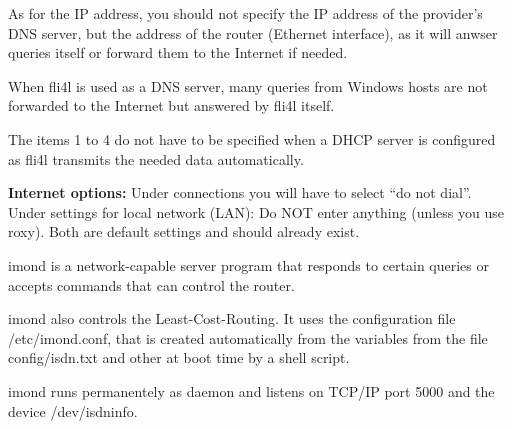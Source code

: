   As for the IP address, you should not specify the IP address of the provider's
  DNS server, but the address of the router (Ethernet interface), as it
  will anwser queries itself or forward them to the Internet if needed.

  When fli4l is used as a DNS server, many queries from Windows hosts are not
  forwarded to the Internet but answered by fli4l itself.


  The items 1 to 4 do not have to be specified when a DHCP server is
  configured as fli4l transmits the needed data automatically.

  \textbf{Internet options:} Under connections you will have to select ``do not dial''.
  Under settings for local network (LAN): Do NOT enter anything (unless you use
  roxy). Both are default settings and should already exist.



  imond is a network-capable server program that responds to certain queries
  or accepts commands that can control the router.

  imond also controls the Least-Cost-Routing. It uses the configuration
  file /etc/imond.conf, that is created automatically from the variables
   from the file config/isdn.txt and other
  at boot time by a shell script.

  imond runs permanentely as daemon and listens on TCP/IP port 5000 and the
  device /dev/isdninfo.


